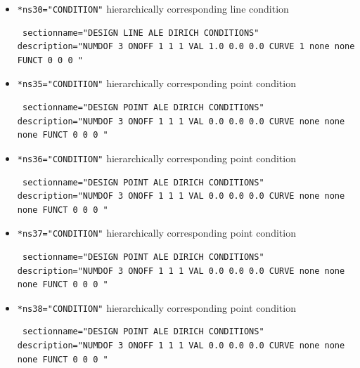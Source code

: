 \begin{itemize}
\item \verb|*ns30="CONDITION"| \qquad hierarchically corresponding line condition
\begin{small} \begin{verbatim} sectionname="DESIGN LINE ALE DIRICH CONDITIONS"
description="NUMDOF 3 ONOFF 1 1 1 VAL 1.0 0.0 0.0 CURVE 1 none none FUNCT 0 0 0 "
\end{verbatim} \end{small}

 \item \verb|*ns35="CONDITION"| \qquad hierarchically corresponding point condition
\begin{small} \begin{verbatim} sectionname="DESIGN POINT ALE DIRICH CONDITIONS"
description="NUMDOF 3 ONOFF 1 1 1 VAL 0.0 0.0 0.0 CURVE none none none FUNCT 0 0 0 "
\end{verbatim} \end{small}

 \item \verb|*ns36="CONDITION"| \qquad hierarchically corresponding point condition
\begin{small} \begin{verbatim} sectionname="DESIGN POINT ALE DIRICH CONDITIONS"
description="NUMDOF 3 ONOFF 1 1 1 VAL 0.0 0.0 0.0 CURVE none none none FUNCT 0 0 0 "
\end{verbatim} \end{small}

 \item \verb|*ns37="CONDITION"| \qquad hierarchically corresponding point condition
\begin{small} \begin{verbatim} sectionname="DESIGN POINT ALE DIRICH CONDITIONS"
description="NUMDOF 3 ONOFF 1 1 1 VAL 0.0 0.0 0.0 CURVE none none none FUNCT 0 0 0 "
\end{verbatim} \end{small} 

\item \verb|*ns38="CONDITION"| \qquad hierarchically corresponding point condition
\begin{small} \begin{verbatim} sectionname="DESIGN POINT ALE DIRICH CONDITIONS"
description="NUMDOF 3 ONOFF 1 1 1 VAL 0.0 0.0 0.0 CURVE none none none FUNCT 0 0 0 "
\end{verbatim} \end{small}

\end{itemize}

